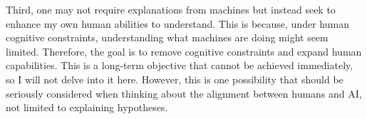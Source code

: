 Third, one may not require explanations from machines but instead seek to enhance my own human abilities to understand. This is because, under human cognitive constraints, understanding what machines are doing might seem limited. Therefore, the goal is to remove cognitive constraints and expand human capabilities. This is a long-term objective that cannot be achieved immediately, so I will not delve into it here. However, this is one possibility that should be seriously considered when thinking about the alignment between humans and AI, not limited to explaining hypotheses.





